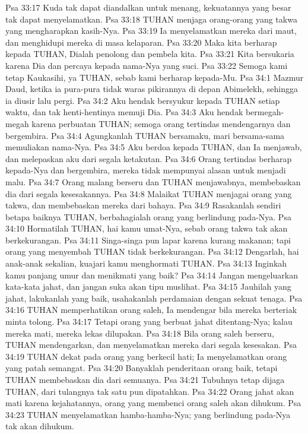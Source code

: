 Psa 33:17  Kuda tak dapat diandalkan untuk menang, kekuatannya yang besar tak dapat menyelamatkan.
Psa 33:18  TUHAN menjaga orang-orang yang takwa yang mengharapkan kasih-Nya.
Psa 33:19  Ia menyelamatkan mereka dari maut, dan menghidupi mereka di masa kelaparan.
Psa 33:20  Maka kita berharap kepada TUHAN, Dialah penolong dan pembela kita.
Psa 33:21  Kita bersukaria karena Dia dan percaya kepada nama-Nya yang suci.
Psa 33:22  Semoga kami tetap Kaukasihi, ya TUHAN, sebab kami berharap kepada-Mu.
Psa 34:1  Mazmur Daud, ketika ia pura-pura tidak waras pikirannya di depan Abimelekh, sehingga ia diusir lalu pergi.
Psa 34:2  Aku hendak bersyukur kepada TUHAN setiap waktu, dan tak henti-hentinya memuji Dia.
Psa 34:3  Aku hendak bermegah-megah karena perbuatan TUHAN; semoga orang tertindas mendengarnya dan bergembira.
Psa 34:4  Agungkanlah TUHAN bersamaku, mari bersama-sama memuliakan nama-Nya.
Psa 34:5  Aku berdoa kepada TUHAN, dan Ia menjawab, dan melepaskan aku dari segala ketakutan.
Psa 34:6  Orang tertindas berharap kepada-Nya dan bergembira, mereka tidak mempunyai alasan untuk menjadi malu.
Psa 34:7  Orang malang berseru dan TUHAN menjawabnya, membebaskan dia dari segala kesesakannya.
Psa 34:8  Malaikat TUHAN menjagai orang yang takwa, dan membebaskan mereka dari bahaya.
Psa 34:9  Rasakanlah sendiri betapa baiknya TUHAN, berbahagialah orang yang berlindung pada-Nya.
Psa 34:10  Hormatilah TUHAN, hai kamu umat-Nya, sebab orang takwa tak akan berkekurangan.
Psa 34:11  Singa-singa pun lapar karena kurang makanan; tapi orang yang menyembah TUHAN tidak berkekurangan.
Psa 34:12  Dengarlah, hai anak-anak sekalian, kuajari kamu menghormati TUHAN.
Psa 34:13  Inginkah kamu panjang umur dan menikmati yang baik?
Psa 34:14  Jangan mengeluarkan kata-kata jahat, dan jangan suka akan tipu muslihat.
Psa 34:15  Jauhilah yang jahat, lakukanlah yang baik, usahakanlah perdamaian dengan sekuat tenaga.
Psa 34:16  TUHAN memperhatikan orang saleh, Ia mendengar bila mereka berteriak minta tolong.
Psa 34:17  Tetapi orang yang berbuat jahat ditentang-Nya; kalau mereka mati, mereka lekas dilupakan.
Psa 34:18  Bila orang saleh berseru, TUHAN mendengarkan, dan menyelamatkan mereka dari segala kesesakan.
Psa 34:19  TUHAN dekat pada orang yang berkecil hati; Ia menyelamatkan orang yang patah semangat.
Psa 34:20  Banyaklah penderitaan orang baik, tetapi TUHAN membebaskan dia dari semuanya.
Psa 34:21  Tubuhnya tetap dijaga TUHAN, dari tulangnya tak satu pun dipatahkan.
Psa 34:22  Orang jahat akan mati karena kejahatannya, orang yang membenci orang saleh akan dihukum.
Psa 34:23  TUHAN menyelamatkan hamba-hamba-Nya; yang berlindung pada-Nya tak akan dihukum.
